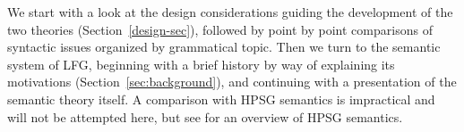 
 We start with a look at the design considerations guiding the development of the two theories (Section~\ref{design-sec}), followed by point by point comparisons of syntactic issues organized by grammatical topic.  Then we turn to the semantic system of LFG, beginning with a brief history by way of explaining its motivations (Section~\ref{sec:background}), and continuing with a presentation of the semantic theory itself.  A comparison with HPSG semantics is impractical and will not be attempted here, but see   for an overview of HPSG semantics.  

